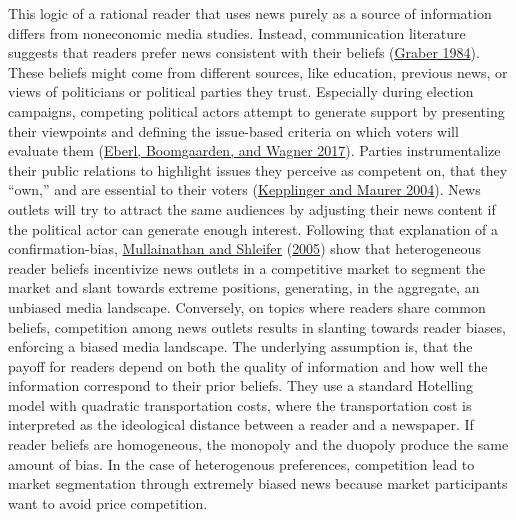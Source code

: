 \documentclass[
  12pt,
]{article}
\begin{document}
This logic of a rational reader that uses news purely as a source of
information differs from noneconomic media studies. Instead,
communication literature suggests that readers prefer news consistent
with their beliefs
(\protect\hyperlink{ref-graber_processing_1984}{Graber 1984}). These
beliefs might come from different sources, like education, previous
news, or views of politicians or political parties they trust.
Especially during election campaigns, competing political actors attempt
to generate support by presenting their viewpoints and defining the
issue-based criteria on which voters will evaluate them
(\protect\hyperlink{ref-eberl_one_2017}{Eberl, Boomgaarden, and Wagner
2017}). Parties instrumentalize their public relations to highlight
issues they perceive as competent on, that they ``own,'' and are
essential to their voters
(\protect\hyperlink{ref-kepplinger_einfluss_2004}{Kepplinger and Maurer
2004}). News outlets will try to attract the same audiences by adjusting
their news content if the political actor can generate enough interest.
Following that explanation of a confirmation-bias,
\protect\hyperlink{ref-mullainathan_market_2005}{Mullainathan and
Shleifer} (\protect\hyperlink{ref-mullainathan_market_2005}{2005}) show
that heterogeneous reader beliefs incentivize news outlets in a
competitive market to segment the market and slant towards extreme
positions, generating, in the aggregate, an unbiased media landscape.
Conversely, on topics where readers share common beliefs, competition
among news outlets results in slanting towards reader biases, enforcing
a biased media landscape. The underlying assumption is, that the payoff
for readers depend on both the quality of information and how well the
information correspond to their prior beliefs. They use a standard
Hotelling model with quadratic transportation costs, where the
transportation cost is interpreted as the ideological distance between a
reader and a newspaper. If reader beliefs are homogeneous, the monopoly
and the duopoly produce the same amount of bias. In the case of
heterogenous preferences, competition lead to market segmentation
through extremely biased news because market participants want to avoid
price competition.
\end{document}
